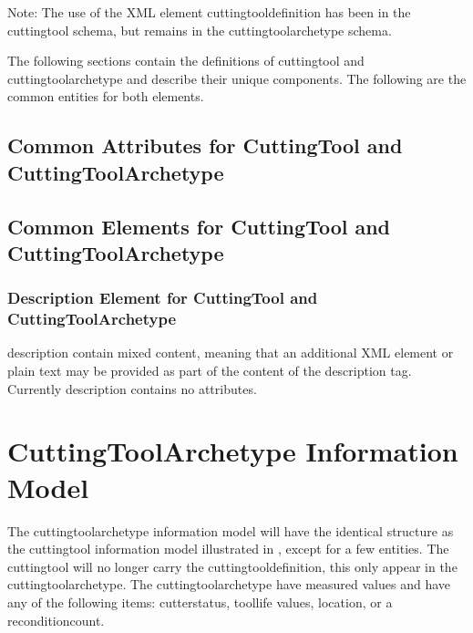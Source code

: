 \FloatBarrier

\begin{note}
Note: The use of the XML element \gls{cuttingtooldefinition} has been \DEPRECATED in the \gls{cuttingtool} schema, but remains in the \gls{cuttingtoolarchetype} schema.

\end{note}

The following sections contain the definitions of \gls{cuttingtool} and \gls{cuttingtoolarchetype} and describe their unique components. The following are the common entities for both elements.

\subsection{Common Attributes for CuttingTool and CuttingToolArchetype}
\label{sec:Common Attributes for CuttingTool and CuttingToolArchetype}



\pagebreak

\subsection{Common Elements for CuttingTool and CuttingToolArchetype}



\subsubsection{Description Element for CuttingTool and CuttingToolArchetype}
\gls{description} \MAY contain mixed content, meaning that an additional XML element or plain text may be provided as part of the content of the description tag.  Currently \gls{description} contains no attributes.

\section{CuttingToolArchetype Information Model}
The \gls{cuttingtoolarchetype} \gls{information model} will have the identical structure as the \gls{cuttingtool} \gls{information model} illustrated in , except for a few entities.  The \gls{cuttingtool} will no longer carry the \gls{cuttingtooldefinition}, this \MUST only appear in the \gls{cuttingtoolarchetype}.  The \gls{cuttingtoolarchetype} \MUSTNOT have measured values and \MUSTNOT have any of the following items: \gls{cutterstatus}, \gls{toollife} values, \gls{location}, or a \gls{reconditioncount}. 

